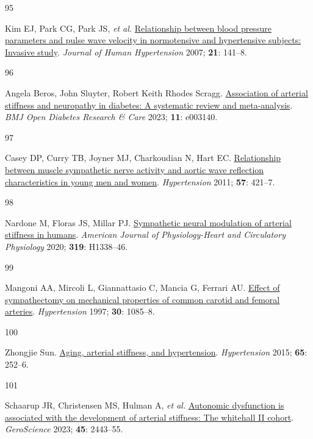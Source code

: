 \documentclass[
  letterpaper,
  headsepline=true,
  open=any]{scrbook}
\newlength{\cslhangindent}
\newlength{\csllabelwidth}
\newlength{\cslentryspacingunit} %
\newenvironment{CSLReferences}[2] %
 {%
  \setlength{\parindent}{0pt}
  \ifodd #1
  \let\oldpar\par
  \def\par{\hangindent=\cslhangindent\oldpar}
  \fi
  \setlength{\parskip}{#2\cslentryspacingunit}
 }%
 {}
\newcommand{\CSLLeftMargin}[1]{\parbox[t]{\csllabelwidth}{#1}}
\newcommand{\CSLRightInline}[1]{\parbox[t]{\linewidth - \csllabelwidth}{#1}\break}
\begin{document}
\begin{CSLReferences}{0}{0}
\leavevmode{}%
\CSLLeftMargin{95 }%
\CSLRightInline{Kim EJ, Park CG, Park JS, \emph{et al.}
\href{https://doi.org/10.1038/sj.jhh.1002120}{Relationship between blood
pressure parameters and pulse wave velocity in normotensive and
hypertensive subjects: Invasive study}. \emph{Journal of Human
Hypertension} 2007; \textbf{21}: 141--8.}

\leavevmode{}%
\CSLLeftMargin{96 }%
\CSLRightInline{Angela Beros, John Sluyter, Robert Keith Rhodes Scragg.
\href{https://doi.org/10.1136/bmjdrc-2022-003140}{Association of
arterial stiffness and neuropathy in diabetes: A systematic review and
meta-analysis}. \emph{BMJ Open Diabetes Research \& Care} 2023;
\textbf{11}: e003140.}

\leavevmode{}%
\CSLLeftMargin{97 }%
\CSLRightInline{Casey DP, Curry TB, Joyner MJ, Charkoudian N, Hart EC.
\href{https://doi.org/10.1161/HYPERTENSIONAHA.110.164517}{Relationship
between muscle sympathetic nerve activity and aortic wave reflection
characteristics in young men and women}. \emph{Hypertension} 2011;
\textbf{57}: 421--7.}

\leavevmode{}%
\CSLLeftMargin{98 }%
\CSLRightInline{Nardone M, Floras JS, Millar PJ.
\href{https://doi.org/10.1152/ajpheart.00734.2020}{Sympathetic neural
modulation of arterial stiffness in humans}. \emph{American Journal of
Physiology-Heart and Circulatory Physiology} 2020; \textbf{319}:
H1338--46.}

\leavevmode{}%
\CSLLeftMargin{99 }%
\CSLRightInline{Mangoni AA, Mircoli L, Giannattasio C, Mancia G, Ferrari
AU. \href{https://doi.org/10.1161/01.HYP.30.5.1085}{Effect of
sympathectomy on mechanical properties of common carotid and femoral
arteries}. \emph{Hypertension} 1997; \textbf{30}: 1085--8.}

\leavevmode{}%
\CSLLeftMargin{100 }%
\CSLRightInline{Zhongjie Sun.
\href{https://doi.org/doi:10.1161/HYPERTENSIONAHA.114.03617}{Aging,
arterial stiffness, and hypertension}. \emph{Hypertension} 2015;
\textbf{65}: 252--6.}

\leavevmode{}%
\CSLLeftMargin{101 }%
\CSLRightInline{Schaarup JR, Christensen MS, Hulman A, \emph{et al.}
\href{https://doi.org/10.1007/s11357-023-00762-0}{Autonomic dysfunction
is associated with the development of arterial stiffness: The whitehall
II cohort}. \emph{GeroScience} 2023; \textbf{45}: 2443--55.}


\end{CSLReferences}
\end{document}
